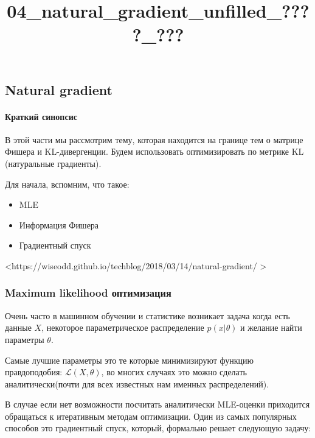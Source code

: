 \documentclass[11pt]{article}
\title{04\_natural\_gradient\_unfilled\_????\_???}
\providecommand{\tightlist}{%
      \setlength{\itemsep}{0pt}\setlength{\parskip}{0pt}}
\begin{document}
    
    
    \maketitle
    
    

    
    \subsection{Natural gradient}\label{natural-gradient}

\paragraph{Краткий
синопсис}\label{ux43aux440ux430ux442ux43aux438ux439-ux441ux438ux43dux43eux43fux441ux438ux441}

В этой части мы рассмотрим тему, которая находится на границе тем о
матрице Фишера и KL-дивергенции. Будем использовать оптимизировать по
метрике KL (натуральные градиенты).

Для начала, вспомним, что такое:

\begin{itemize}
\tightlist
\item
  MLE 
\item
  Информация Фишера 
\item
  Градиентный спуск
\end{itemize}

\textless{}https://wiseodd.github.io/techblog/2018/03/14/natural-gradient/
\textgreater{}

    \subsubsection{Maximum likelihood
оптимизация}\label{maximum-likelihood-ux43eux43fux442ux438ux43cux438ux437ux430ux446ux438ux44f}

Очень часто в машинном обучении и статистике возникает задача когда есть
данные \(X\), некоторое параметрическое распределение \(p(x | \theta)\)
и желание найти параметры \(\theta\).

Самые лучшие параметры это те которые минимизируют функцию
правдоподобия: \(\mathcal{L}(X, \theta)\), во многих случаях это можно
сделать аналитически(почти для всех известных нам именных
распределений).

В случае если нет возможности посчитать аналитически MLE-оценки
приходится обращаться к итеративным методам оптимизации. Один из самых
популярных способов это градиентный спуск, который, формально решает
следующую задачу:
\end{document}
